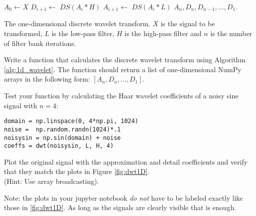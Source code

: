 \begin{algorithm}[H]
\begin{algorithmic}[1]
    \State $A_0 \gets X$            
        \State $D_{i+1} \gets \,\,DS(A_i * H)$ 
        \State $A_{i+1} \gets \,\,DS(A_i * L)$ 
    \EndFor
    \State {} $A_n,D_n, D_{n-1},\ldots, D_1$.
\EndProcedure
\end{algorithmic}
\caption{The one-dimensional discrete wavelet transform. $X$ is the signal to be transformed, $L$ is the low-pass filter, $H$ is the high-pass filter and $n$ is the number of
filter bank iterations.}
\label{alg:1d_wavelet}
\end{algorithm}

\begin{problem}
Write a function that calculates the discrete wavelet transform using Algorithm \ref{alg:1d_wavelet}.
The function should return a list of one-dimensional NumPy arrays in the following form: $[A_n, D_n, \ldots, D_1]$.


Test your function by calculating the Haar wavelet coefficients of a noisy sine signal with $n=4$:

\begin{lstlisting}
domain = np.linspace(0, 4*np.pi, 1024)
noise =  np.random.randn(1024)*.1
noisysin = np.sin(domain) + noise
coeffs = dwt(noisysin, L, H, 4)
\end{lstlisting}

Plot the original signal with the approximation and detail coefficients and verify that they match the plots in Figure \ref{fig:dwt1D}.
\\ (Hint: Use array broadcasting). 

Note: the plots in your jupyter notebook \textit{do not} have to be labeled exactly like those in \ref{fig:dwt1D}. As long as the signals are clearly visible that is enough.
\label{prob:dwt1D}
\end{problem}

